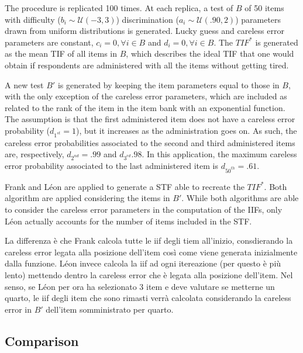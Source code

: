 \documentclass{svproc}
\begin{document}
The procedure is replicated 100 times. At each replica, a test of $B$ of 50 items with difficulty ($b_i \sim \mathcal{U}(-3, 3)$) discrimination ($a_i \sim \mathcal{U}(.90, 2)$) parameters drawn from uniform distributions is generated. Lucky 
guess and careless error parameters are constant, $c_i = 0, \forall i \in B$ and $d_i = 0, \forall i \in B$.
The $TIF^*$ is generated as the mean TIF of all items in $B$, which describes the ideal TIF that one would obtain if respondents are administered with all the items without getting tired. 

A new test $B'$ is generated by keeping the item parameters equal to those in $B$, with the only exception of the careless error parameters, which are included as related to the rank of the item in the item bank with an exponential function. 
The assumption is that the first administered item does not have a careless error probability ($d_{1^{st}} = 1$), but it increases as the administration goes on. As such, the careless error probabilities associated to the second and third administered items are, respectively, $d_{2^{nd}} = .99$ and $d_{3^{rd}}.98$. In this application, the maximum careless error probability associated to the last administered item is $d_{50^{th}} = .61$.

\color{blue}
Frank and Léon are applied to generate a STF able to recreate the $TIF^*$. Both algorithm are applied considering the items in $B'$. While both algorithms are able to consider the careless error parameters in the computation of the IIFs, only Léon actually accounts for the number of items included in the STF.

La differenza è che Frank calcola tutte le iif degli tiem all'inizio, consdierando la careless error legata alla posizione dell'item così come viene generata inizialmente dalla funzione. 
Léon invece calcola la iif ad ogni itereazione (per questo è più lento) mettendo dentro la careless error che è legata alla posizione dell'item. Nel senso, se Léon per ora ha selezionato 3 item e deve valutare se metterne un quarto, le iif degli item che sono rimasti verrà calcolata considerando la careless error in $B'$ dell'item somministrato per quarto.
\normalcolor


\subsection{Comparison}
\end{document}
